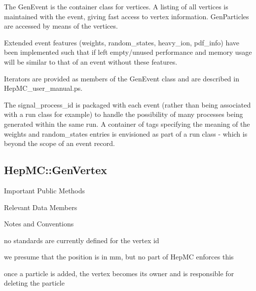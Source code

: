 \documentclass[11pt,letterpaper]{article}
\begin{document}
The GenEvent is the container class for vertices. 
A listing of all vertices is maintained with the event, giving fast
access to vertex information. GenParticles are accessed by means of the
vertices.

Extended event features (weights, random\_states, heavy\_ion, pdf\_info) 
have been implemented such that if left empty/unused performance and memory
usage will be similar to that of an event without these features.

Iterators are provided as members of the GenEvent class and are
described in HepMC\_user\_manual.ps. 

The signal\_process\_id is packaged with each event (rather than being
associated with a run class for example) to handle the possibility of
many processes being generated within the same run. A container of
tags specifying the meaning of the weights and random\_states entries
is envisioned as part of a run class - which is beyond the scope of an
event record.
%
%

\subsection{HepMC::GenVertex}
\begin{myitemize}{Important Public Methods}
\end{myitemize}
\begin{myitemize}{Relevant Data Members}
\end{myitemize}
\begin{myitemize}{Notes and Conventions}
  \item no standards are currently defined for the vertex id
  \item we presume that the position is in mm, but no part of HepMC
        enforces this
  \item once a particle is added, the vertex becomes its owner and is
    responsible for deleting the particle
\end{myitemize}
\end{document}
